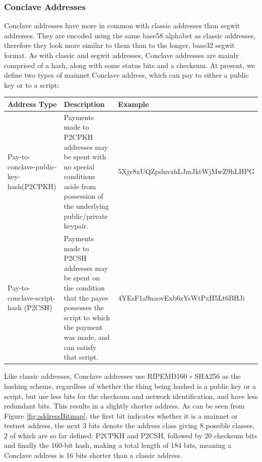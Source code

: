 \documentclass{report}
\begin{document}
			\subsubsection{Conclave Addresses}
			Conclave addresses have more in common with classic addresses than segwit addresses.  They are encoded using the same base58  alphabet as classic addresses, therefore they look more similar to them than to the longer, base32 segwit format. As with classic and segwit addresses, Conclave addresses are mainly comprised of a hash, along with some status bits and a checksum. At present, we define two types of mainnet Conclave address, which can pay to either a public key or to a script:
			\tiny
			\begin{center}
				\renewcommand{\arraystretch}{1.9}
				\begin{tabular}{ |p{2cm}|p{4.8cm}|p{7.2cm}| } 
					\hline
					\textbf{Address Type} & \textbf{Description} & \textbf{Example} \\
					\hline
					Pay-to-conclave-public-key-hash\newline(P2CPKH) & Payments made to P2CPKH addresses may be spent with no special conditions aside from possession of the underlying public/private keypair. & 5Xjy8xUQZpdnvzhLJmJktWjMwZ9hLHPG \\
					Pay-to-conclave-script-hash (P2CSH) & Payments made to P2CSH addresses may be spent on the condition that the payee possesses the script to which the payment was made, and can satisfy that script. & 4YEsF1a9naovExb6zYsWtPxH5Lt6BHJi \\
					\hline
				\end{tabular}
			\end{center}
			\normalsize

			Like classic addresses, Conclave addresses use RIPEMD160 $\circ$ SHA256   as the hashing scheme, regardless of whether the thing being hashed is a public key or a script, but use less bits for the checksum and network identification, and have less redundant bits. This results in a slightly shorter address. As can be seen from Figure \ref{fig:addressBitmap}, the first bit indicates whether it is a mainnet or testnet address, the next 3 bits denote the address class giving 8 possible classes, 2 of which are so far defined: P2CPKH and P2CSH, followed by 20 checksum bits and finally the 160-bit hash, making a total length of 184 bits, meaning a Conclave address is 16 bits shorter than a classic address. 
\end{document}
